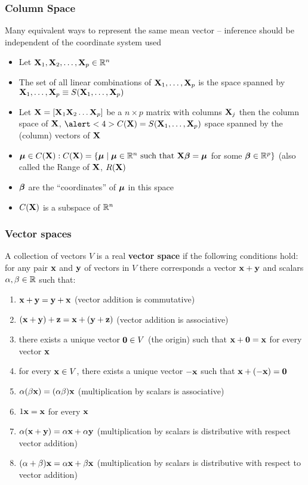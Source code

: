 \documentclass{beamer}
\begin{document}
\begin{frame}
  \frametitle{Column Space}
Many equivalent ways to represent the same mean vector -- inference
should be independent of the coordinate system used \pause
\begin{itemize}
\item Let $\mathbf{X}_1, \mathbf{X}_2,\ldots, \mathbf{X}_p \in \mathbb{R}^n$  \pause
\item The set of all linear combinations of $\mathbf{X}_1, \ldots, \mathbf{X}_p$ is
  the space spanned by $\mathbf{X}_1, \ldots, \mathbf{X}_p \equiv S(\mathbf{X}_1, \ldots,
  \mathbf{X}_p)$  \pause
\item Let $\mathbf{X} = [ \mathbf{X}_1\mathbf{X}_2 \ldots \mathbf{X}_p]$ be a $n \times p$ matrix with
  columns $\mathbf{X}_j$ then the column space of $\mathbf{X}$, $\alert<4>{C(\X) = S(\X_1, \ldots,
  \X_p)}$ space spanned by the (column) vectors of $\mathbf{X}$ \pause
\item $\boldsymbol{\mu} \in C(\mathbf{X}): C(\mathbf{X}) = \{\boldsymbol{\mu} \mid \boldsymbol{\mu} \in \mathbb{R}^n \text{ such
    that } \mathbf{X} \boldsymbol{\beta} =
    \boldsymbol{\mu} $ for some $\boldsymbol{\beta} \in \mathbb{R}^p\}$  (also called the Range of $\mathbf{X}$,
    $R(\mathbf{X})$ \pause
\item $\boldsymbol{\beta}$ are the ``coordinates'' of $\boldsymbol{\mu}$  in this space \pause
\item $C(\mathbf{X})$ is a subspace of $\mathbb{R}^n$
\end{itemize}
\end{frame}
\begin{frame}
  \frametitle{Vector spaces}
A collection of vectors $V$ is a real {\bf vector
  space} if the following conditions hold: for any pair $\mathbf{x}$ and $\mathbf{y}$
of vectors in $V$ there corresponds a vector $\mathbf{x} + \mathbf{y}$ and scalars
$\alpha, \beta \in \mathbb{R}$ such that: \pause
\begin{small}
\begin{enumerate}
\item $\mathbf{x} + \mathbf{y} = \mathbf{y} + \mathbf{x}$  (vector addition is commutative) \pause
\item $(\mathbf{x} + \mathbf{y}) + \mathbf{z} = \mathbf{x} + (\mathbf{y} + \mathbf{z})$ (vector addition is
  associative) \pause
\item there exists a unique vector $\mathbf{0} \in V$ (the origin) such that $\mathbf{x} + \mathbf{0} =
 \mathbf{x}$ for every vector $\mathbf{x}$ \pause
\item for every $\mathbf{x} \in V$, there exists a unique vector $-\mathbf{x}$ such that $\mathbf{x} + 
(-\mathbf{x}) = \mathbf{0}$ \pause
\item $\alpha (\beta \mathbf{x}) = (\alpha \beta) \mathbf{x} $ (multiplication by
  scalars is associative) \pause
\item $1 \mathbf{x} = \mathbf{x}$ for every $\mathbf{x}$ \pause 
\item $\alpha(\mathbf{x} + \mathbf{y}) = \alpha \mathbf{x} + \alpha \mathbf{y}$ (multiplication by
  scalars is distributive with respect vector addition) \pause
\item $(\alpha + \beta)\mathbf{x} = \alpha \mathbf{x} + \beta \mathbf{x}$ (multiplication by scalars is 
distributive with respect to vector addition)
\end{enumerate}
  
\end{small}

\end{frame}
\end{document}
